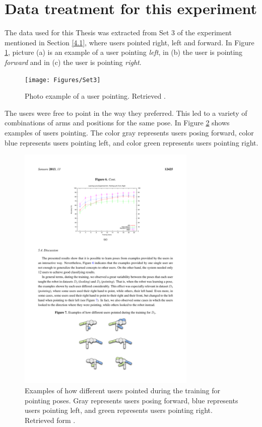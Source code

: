 \section{Data treatment for this experiment} \label{4.2}

The data used for this Thesis was extracted from Set 3 of the experiment mentioned in Section \ref{4.1}, where users pointed right, left and forward. In Figure \ref{fig:set3}, picture (a) is an example of a user pointing \emph{left}, in (b) the user is pointing \emph{forward} and in (c) the user is pointing \emph{right}.

\begin{figure}[h]
\texttt{[image: Figures/Set3]}
\centering
\caption{Photo example of a user pointing. Retrieved \cite{Gonzalez-Pacheco2013}. \label{fig:set3}}
\end{figure}

The users were free to point in the way they preferred. This led to a variety of combinations of arms and positions for the same pose. In Figure \ref{fig:poses} shows examples of users pointing. The color gray represents users posing forward, color blue represents users pointing left, and color green represents users pointing right. 

\begin{figure}[h]
\includegraphics[width=8.5cm]{Figures/Poses}
\centering
\caption[Examples of how different users pointed during the training for pointing poses.]{Examples of how different users pointed during the training for pointing poses. Gray represents users posing forward, blue represents users pointing left, and green represents users pointing right.  Retrieved form \cite{Gonzalez-Pacheco2013}. \label{fig:poses}}
\end{figure}

